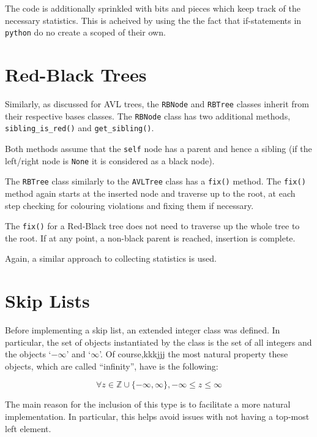 \documentclass[article]{uom-coursework}
\begin{document}
The code is additionally sprinkled with bits and pieces which
keep track of the necessary statistics. This is acheived by
using the the fact that if-statements in \texttt{python} do no
create a scoped of their own.

\section{Red-Black Trees}

Similarly, as discussed for AVL trees, the \texttt{RBNode} and
\texttt{RBTree} classes inherit from their respective bases
classes. The \texttt{RBNode} class has two additional methods,
\texttt{sibling\_is\_red()} and \texttt{get\_sibling()}.

\begin{note}
Both methods assume that the \texttt{self} node has a parent and
hence a sibling (if the left/right node is \texttt{None} it is
considered as a black node).
\end{note}

The \texttt{RBTree} class similarly to the \texttt{AVLTree}
class has a \texttt{fix()} method. The \texttt{fix()} method
again starts at the inserted node and traverse up to the root,
at each step checking for colouring violations and fixing them
if necessary. 

\begin{note}
The \texttt{fix()} for a Red-Black tree does not need to
traverse up the whole tree to the root. If at any point, a
non-black parent is reached, insertion is complete.
\end{note}

Again, a similar approach to collecting statistics is used.

\section{Skip Lists}

Before implementing a skip list, an extended integer class was
defined. In particular, the set of objects instantiated by the
class is the set of all integers and the objects `$-\infty$' and
`$\infty$'. Of course,kkkjjj the most natural property these objects,
which are called ``infinity'', have is the following:

$$\forall z \in \mathbb{Z} \cup \{-\infty, \infty\}, -\infty \leq z \leq \infty$$

The main reason for the inclusion of this type is to facilitate
a more natural implementation. In particular, this helps avoid
issues with not having a top-most left element.
\end{document}
